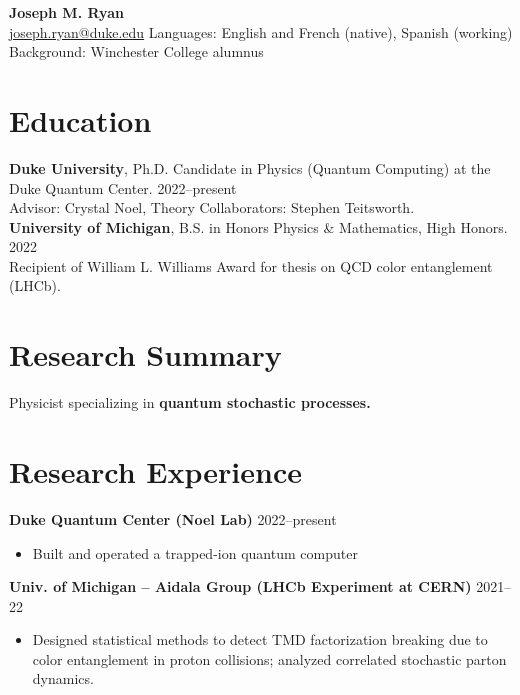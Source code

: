 \documentclass[10pt]{article}
\begin{document}
\begin{center}
    {\Large \textbf{Joseph M. Ryan}} \\[1pt]
    \href{mailto:joseph.ryan@duke.edu}{joseph.ryan@duke.edu}    Languages: English and French (native), Spanish (working)\\
    Background: Winchester College alumnus
\end{center}


\section*{Education}
\noindent\textbf{Duke University}, Ph.D. Candidate in Physics (Quantum Computing) at the Duke Quantum Center. \hfill 2022--present \\
\indent  Advisor: Crystal Noel,  Theory Collaborators: Stephen Teitsworth. \\
\noindent
\textbf{University of Michigan}, B.S. in Honors Physics \& Mathematics, High Honors. \hfill 2022 \\
\indent Recipient of William L. Williams Award for thesis on QCD color entanglement (LHCb).

\section*{Research Summary}
\noindent Physicist specializing in \textbf{quantum stochastic processes.} 

\section*{Research Experience}
\noindent\textbf{Duke Quantum Center (Noel Lab)} \hfill 2022--present
\begin{itemize}
    \item Built and operated a trapped-ion quantum computer
\end{itemize}



\noindent\textbf{Univ. of Michigan -- Aidala Group (LHCb Experiment at CERN)} \hfill 2021--22
\begin{itemize}
    \item Designed statistical methods to detect TMD factorization breaking due to color entanglement in proton collisions; analyzed correlated stochastic parton dynamics.
\end{itemize}

\end{document}
